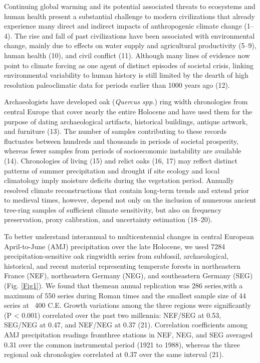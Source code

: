 \documentclass[10pt,a4paper,twoside,onecolumn]{article}
\begin{document}
\begin{myfont}
	\begin{multicols}{3}
{\huge C}ontinuing global warming and its potential associated threats to ecosystems and human health present a substantial challenge
to modern civilizations that already experience many direct and indirect impacts of anthropogenic climate change (1–4). The rise and fall of
past civilizations have been associated with environmental change, mainly due to effects on water supply and agricultural productivity (5–9), human
health (10), and civil conflict (11). Although many lines of evidence now point to climate forcing as one agent of distinct episodes of societal
crisis, linking environmental variability to human history is still limited by the dearth of high resolution paleoclimatic data for periods earlier than
1000 years ago (12). \par
Archaeologists have developed oak (\textit{Quercus spp.}) ring width chronologies from central Europe that cover nearly the entire Holocene and have used them for the purpose of dating archaeological artifacts, historical buildings, antique artwork, and furniture (13). The number of samples contributing to these records fluctuates between hundreds and thousands in periods of societal prosperity, whereas fewer samples from periods of socioeconomic instability are available (14). Chronologies of living (15) and relict oaks (16, 17) may reflect distinct patterns of summer precipitation and drought if site ecology and local climatology imply moisture deficits during the vegetation period. Annually resolved climate reconstructions that contain long-term trends and extend prior to
medieval times, however, depend not only on the inclusion of numerous ancient tree-ring samples of sufficient climate sensitivity, but also on frequency
preservation, proxy calibration, and uncertainty estimation (18–20). \par
To better understand interannual to multicentennial changes in central European April-to-June (AMJ) precipitation over the late Holocene, we used 7284 precipitation-sensitive oak ringwidth series from subfossil, archaeological, historical, and recent material representing temperate forests
in northeastern France (NEF), northeastern Germany (NEG), and southeastern Germany (SEG) (Fig. \ref{Fig1}). We found that themean annual replication was 286
series,with a maximum of 550 series during Roman times and the smallest sample size of 44 series at ~400 C.E. Growth variations among the three
regions were significantly (P < 0.001) correlated over the past two millennia: NEF/SEG at 0.53, SEG/NEG at 0.47, and NEF/NEG at 0.37 (21). Correlation coefficients among AMJ precipitation readings fromthree stations in NEF, NEG, and SEG averaged 0.31 over the common instrumental period (1921 to 1988), whereas the three regional oak chronologies correlated at 0.37 over the same interval (21). \par

\end{multicols}
\end{myfont}
\end{document}
